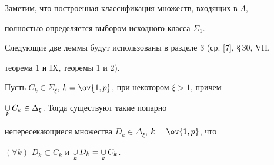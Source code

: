  


Заметим, что построенная классификация множеств, входящих в $\Lambda$, 


полностью определяется выбором исходного класса $\Sigma_1$. 


 


Следующие две леммы будут использованы в разделе 3 (ср. [7], \S\,30, VII, 


теорема 1 и IX, теоремы 1 и 2). 


 


\begin{lems} 


Пусть $C_k\in\Sigma_\xi$, $k=\ov{1,p}$, при некотором $\xi>1$, причем 


$\mathop{\cup}\limits_k C_k\in\Delta_\xi$. Тогда существуют такие попарно 


непересекающиеся множества $D_k\in\Delta_\xi$, $k=\ov{1,p}$, что 


$(\forall k)$ $D_k\subset C_k$ и $\mathop{\cup}\limits_k D_k=\mathop{\cup}\limits_k C_k$. 


\end{lems} 


 


